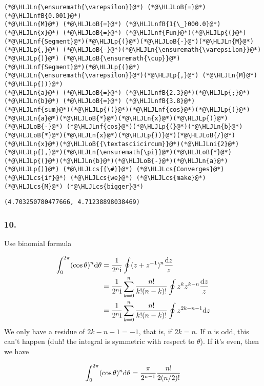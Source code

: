 \documentclass[12pt,a4paper]{article}
\newcommand{\HLJLn}[1]{#1}
\newcommand{\HLJLnf}[1]{\textcolor[RGB]{66,102,213}{#1}}
\newcommand{\HLJLnfB}[1]{\textcolor[RGB]{59,151,46}{#1}}
\newcommand{\HLJLni}[1]{\textcolor[RGB]{59,151,46}{#1}}
\newcommand{\HLJLoB}[1]{\textcolor[RGB]{102,102,102}{\textbf{#1}}}
\newcommand{\HLJLp}[1]{#1}
\newcommand{\HLJLcs}[1]{\textcolor[RGB]{153,153,119}{\textit{#1}}}
\def\D{ {\rm d} }
\def\I{ {\rm i} }
\def\dz{\D z}
\begin{document}
\begin{lstlisting}
(*@\HLJLn{\ensuremath{\varepsilon}}@*) (*@\HLJLoB{=}@*)(*@\HLJLnfB{0.001}@*)
(*@\HLJLn{M}@*) (*@\HLJLoB{=}@*) (*@\HLJLnfB{1{\_}000.0}@*)
(*@\HLJLn{x}@*) (*@\HLJLoB{=}@*) (*@\HLJLnf{Fun}@*)(*@\HLJLp{(}@*)(*@\HLJLnf{Segment}@*)(*@\HLJLp{(}@*)(*@\HLJLoB{-}@*)(*@\HLJLn{M}@*) (*@\HLJLp{,}@*) (*@\HLJLoB{-}@*)(*@\HLJLn{\ensuremath{\varepsilon}}@*)(*@\HLJLp{)}@*) (*@\HLJLoB{\ensuremath{\cup}}@*) (*@\HLJLnf{Segment}@*)(*@\HLJLp{(}@*)(*@\HLJLn{\ensuremath{\varepsilon}}@*)(*@\HLJLp{,}@*) (*@\HLJLn{M}@*)(*@\HLJLp{))}@*)
(*@\HLJLn{a}@*) (*@\HLJLoB{=}@*) (*@\HLJLnfB{2.3}@*)(*@\HLJLp{;}@*) (*@\HLJLn{b}@*) (*@\HLJLoB{=}@*) (*@\HLJLnfB{3.8}@*)
(*@\HLJLnf{sum}@*)(*@\HLJLp{((}@*)(*@\HLJLnf{cos}@*)(*@\HLJLp{(}@*)(*@\HLJLn{a}@*)(*@\HLJLoB{*}@*)(*@\HLJLn{x}@*)(*@\HLJLp{)}@*) (*@\HLJLoB{-}@*) (*@\HLJLnf{cos}@*)(*@\HLJLp{(}@*)(*@\HLJLn{b}@*)(*@\HLJLoB{*}@*)(*@\HLJLn{x}@*)(*@\HLJLp{))}@*)(*@\HLJLoB{/}@*)(*@\HLJLn{x}@*)(*@\HLJLoB{{\textasciicircum}}@*)(*@\HLJLni{2}@*)(*@\HLJLp{),}@*)(*@\HLJLn{\ensuremath{\pi}}@*)(*@\HLJLoB{*}@*)(*@\HLJLp{(}@*)(*@\HLJLn{b}@*)(*@\HLJLoB{-}@*)(*@\HLJLn{a}@*)(*@\HLJLp{)}@*) (*@\HLJLcs{{\#}}@*) (*@\HLJLcs{Converges}@*) (*@\HLJLcs{if}@*) (*@\HLJLcs{we}@*) (*@\HLJLcs{make}@*) (*@\HLJLcs{M}@*) (*@\HLJLcs{bigger}@*)
\end{lstlisting}

\begin{lstlisting}
(4.703250780477666, 4.71238898038469)
\end{lstlisting}


\subsubsection{10.}
Use binomial formula


\begin{align*}
\int_0^{2 \pi} (\cos \theta)^n \D \theta &= {1 \over 2^n \I} \oint (z+z^{-1})^n {\dz \over z} \\
 &=  {1 \over 2^n \I} \sum_{k=0}^n {n! \over k! (n-k)!} \oint z^k z^{k-n} {\dz \over z} \\
 &=  {1 \over 2^n \I} \sum_{k=0}^n {n! \over k! (n-k)!} \oint z^{2k-n-1}\dz
\end{align*}
We only have a residue of $2k-n-1 = -1$, that is, if $2k = n$. If $n$ is odd, this can't happen (duh! the integral is symmetric with respect to $\theta$). If it's even, then we have

\[
\int_0^{2 \pi} (\cos \theta)^n \D \theta =  {\pi \over 2^{n-1} }  {n! \over 2 (n/2)!}
\]
\end{document}
